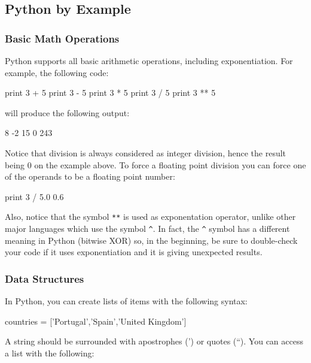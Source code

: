 
\subsection{Python by Example}

\subsubsection{Basic Math Operations}

Python supports all basic arithmetic operations, including exponentiation. For
example, the following code: \begin{python}
print 3 + 5
print 3 - 5
print 3 * 5
print 3 / 5
print 3 ** 5
\end{python}

\noindent will produce the following output:
\begin{python}
8
-2
15
0
243
\end{python}

Notice that division is always considered as integer division, hence the result
being 0 on the example above. To force a floating point division you can force
one of the operands to be a floating point number: \begin{python}
print 3 / 5.0
0.6
\end{python}

Also, notice that the symbol \texttt{**} is used as exponentation operator, unlike other major languages which use the symbol \texttt{\^}. In fact, the \texttt{\^} symbol has a different meaning in Python (bitwise XOR) so, in the beginning, be sure to double-check your code if it uses exponentiation and it is giving unexpected results.

\subsubsection{Data Structures}

In Python, you can create lists of items with the following syntax:

\begin{python}
countries = ['Portugal','Spain','United Kingdom']
\end{python}

\noindent A string should be surrounded with apostrophes (') or quotes (``). You can access a list with
the following:

